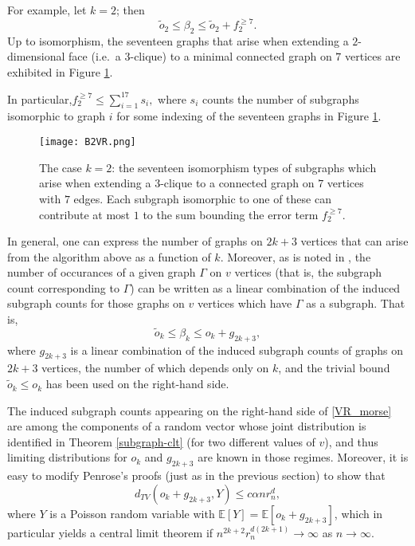 \documentclass{amsart}
\theoremstyle{definition}
\newcommand{\E}{\mathbb{E}}
\renewcommand{\1}{\mathbb{1}}
\begin{document}
For example, let $k=2$; then  
 $$\tilde{o}_2 \le \beta_2 \le \tilde{o}_2 + f_2^{\ge
  7}.$$  Up to isomorphism, the seventeen graphs that arise when
extending a $2$-dimensional face (i.e.\ a $3$-clique) to a minimal
connected graph on $7$ vertices are exhibited in Figure
\ref{fig:betti2}.

In particular,$f_2^{\ge 7} \le \sum_{i=1}^{17} s_i,$ where
$s_i$ counts the number of subgraphs isomorphic to graph $i$ for some
indexing of the seventeen graphs in Figure \ref{fig:betti2}.

\begin{figure}
\begin{centering}
\texttt{[image: B2VR.png]}
\end{centering}
\caption{The case $k=2$: the seventeen isomorphism types of subgraphs
  which arise when extending a $3$-clique to a connected graph on $7$
  vertices with $7$ edges.  Each
  subgraph isomorphic to one of these can contribute at most $1$
  to the sum bounding the error term $f_2^{\ge 7}$.}
\label{fig:betti2}
\end{figure}

In general, 
one can express the number of graphs on $2k+3$ vertices that can 
arise from the algorithm above as a function of $k$.  Moreover, 
as is noted in \cite{penrose}, 
the number of occurances of a given graph $\Gamma$ on $v$ vertices (that is, 
the subgraph count corresponding to $\Gamma$) can be written
as a linear combination of the induced subgraph counts for those
graphs on $v$ vertices which have $\Gamma$ as a subgraph.  That is,
\begin{equation}\label{VR_morse}\tilde{o}_k\le\beta_k\le o_k+g_{2k+3},
\end{equation}
where $g_{2k+3}$ is a linear combination of the induced subgraph counts
of graphs on $2k+3$ vertices, the number of which depends only on $k$,
and the trivial bound $\tilde{o}_k\le o_k$ has been used on the right-hand side.

The
induced subgraph counts appearing on the right-hand side of \eqref{VR_morse}
are among the components of a random vector whose 
joint distribution is identified in Theorem \ref{subgraph-clt} (for two different
values of $v$), and thus limiting distributions for
$o_k$ and $g_{2k+3}$ are known in those regimes.  
Moreover, it is easy to modify Penrose's proofs (just as in the previous 
section) to show that 
$$d_{TV}(o_k+g_{2k+3},Y)\le c\alpha nr_n^d,$$
where $Y$ is a Poisson random variable with $\E[Y]=\E[o_k+g_{2k+3}]$,
which in particular yields a central limit theorem if $n^{2k+2}r_n^{d(2k+1)}\to
\infty$ as $n\to\infty$.  
\end{document}
